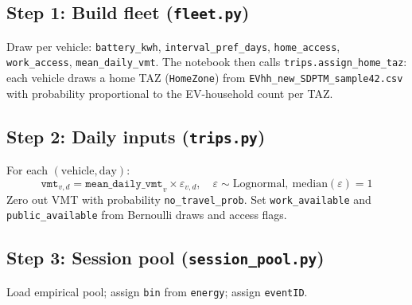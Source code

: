 \documentclass[11pt,a4paper]{article}
\begin{document}
\subsection{Step 1: Build fleet (\texttt{fleet.py})}
Draw per vehicle: \texttt{battery\_kwh}, \texttt{interval\_pref\_days}, \texttt{home\_access}, \texttt{work\_access}, \texttt{mean\_daily\_vmt}. The notebook then calls \texttt{trips.assign\_home\_taz}: each vehicle draws a home TAZ (\texttt{HomeZone}) from \texttt{EVhh\_new\_SDPTM\_sample42.csv} with probability proportional to the EV-household count per TAZ.

\subsection{Step 2: Daily inputs (\texttt{trips.py})}
For each $(\text{vehicle}, \text{day})$:
\begin{equation}
  \texttt{vmt}_{v,d} = \texttt{mean\_daily\_vmt}_v \times \varepsilon_{v,d}, \quad \varepsilon \sim \text{Lognormal},\ \text{median}(\varepsilon)=1
\end{equation}
\noindent Zero out VMT with probability \texttt{no\_travel\_prob}. Set \texttt{work\_available} and \texttt{public\_available} from Bernoulli draws and access flags.

\subsection{Step 3: Session pool (\texttt{session\_pool.py})}
Load empirical pool; assign \texttt{bin} from \texttt{energy}; assign \texttt{eventID}.
\end{document}
